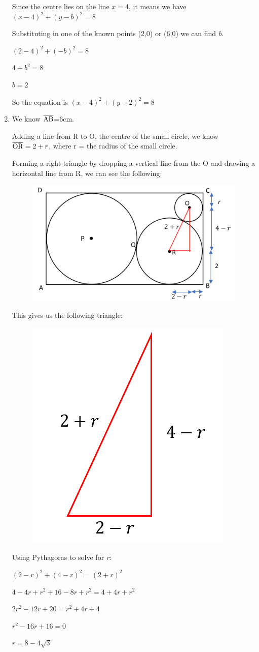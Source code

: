 \documentclass[../main.tex]{subfiles}
\begin{document}
\begin{enumerate}[itemsep=1cm]
    Since the centre lies on the line $x=4$, it means we have $(x-4)^2 + (y-b)^2 = 8$

    Substituting in one of the known points (2,0) or (6,0) we can find \textit{b}.

    $(2-4)^2+(-b)^2=8$

    $4+b^2=8$

    $b=2$

    So the equation is $(x-4)^2 + (y-2)^2 = 8$

    \item
    We know $\overline{\rm AB}$=6cm. 

    Adding a line from R to O, the centre of the small circle, we know $\overline{\rm OR}=2+r$, where r = the radius of the small circle.

    Forming a right-triangle by dropping a vertical line from the O and drawing a horizontal line from R, we can see the following:

    \begin{figure}[H]
        \centering
        \includegraphics[width=0.6\linewidth]{images/t2w8q4a1.png}
    \end{figure}

    This gives us the following triangle:

    \begin{figure}[H]
        \centering
        \includegraphics[width=0.25\linewidth]{images/t2w8q4a2.png}
    \end{figure}

    Using Pythagoras to solve for \textit{r}:

    $(2-r)^2+(4-r)^2=(2+r)^2$

    $4-4r+r^2+16-8r+r^2=4+4r+r^2$

    $2r^2-12r+20=r^2+4r+4$

    $r^2-16r+16=0$

    $r=8-4\sqrt{3}$

\end{enumerate}
\end{document}
